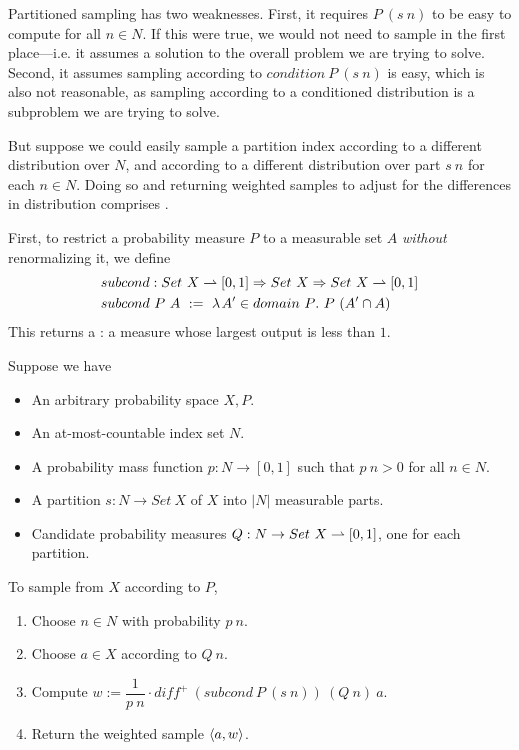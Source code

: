 Partitioned sampling has two weaknesses.
First, it requires $P~(s~n)$ to be easy to compute for all $n \in N$.
If this were true, we would not need to sample in the first place---i.e. it assumes a solution to the overall problem we are trying to solve.
Second, it assumes sampling according to $condition~P~(s~n)$ is easy, which is also not reasonable, as sampling according to a conditioned distribution is a subproblem we are trying to solve.

But suppose we could easily sample a partition index according to a different distribution over $N$, and according to a different distribution over part $s~n$ for each $n \in N$. Doing so and returning weighted samples to adjust for the differences in distribution comprises .

First, to restrict a probability measure $P$ to a measurable set $A$ \emph{without} renormalizing it, we define
\begin{equation}
\begin{aligned}
	&subcond : Set~X \rightharpoonup [0,1] \Rightarrow Set~X \Rightarrow Set~X \rightharpoonup [0,1] \\
	&subcond~P~A\ :=\ \lambda\mspace{2mu}{A' \in domain~P}\ldotp\, P~(A' \cap A)
\end{aligned}
\end{equation}
This returns a : a measure whose largest output is less than $1$.

\begin{definition}
\label{def:partitioned-importance-sampling}
Suppose we have
\begin{itemize}
	\item An arbitrary probability space $X,P$.
	\item An at-most-countable index set $N$.
	\item A probability mass function $p : N \to [0,1]$ such that $p~n > 0$ for all $n \in N$.
	\item A partition $s : N \to Set~X$ of $X$ into $|N|$ measurable parts.
	\item Candidate probability measures $Q : N \to Set~X \rightharpoonup [0,1]$, one for each partition.
\end{itemize}
To sample from $X$ according to $P$,
\begin{enumerate}
	\item Choose $n \in N$ with probability $p~n$.
	\item Choose $a \in X$ according to $Q~n$.
	\item Compute $w := \dfrac{1}{p~n} \cdot diff^+~(subcond~P~(s~n))~(Q~n)~a$.
	\item Return the weighted sample $\langle{a,w}\rangle$.
\end{enumerate}
\end{definition}

